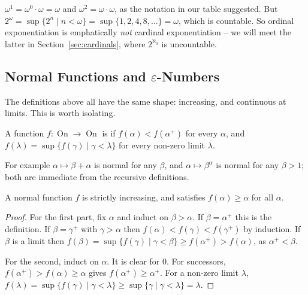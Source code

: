 \documentclass[a4paper]{scrartcl}
\newcommand{\on}{\operatorname{On}}
\begin{document}
\begin{example}
  $\omega^1 = \omega^0 \cdot \omega = \omega$ and $\omega^2 = \omega \cdot \omega$, as the notation in our table suggested. But $2^\omega = \sup\{2^n \mid n < \omega\} = \sup\{1, 2, 4, 8, \dots\} = \omega$, which is countable. So ordinal exponentiation is emphatically \emph{not} cardinal exponentiation -- we will meet the latter in Section~\ref{sec:cardinals}, where $2^{\aleph_0}$ is uncountable.
\end{example}

\subsection{Normal Functions and \texorpdfstring{$\varepsilon$}{epsilon}-Numbers}

The definitions above all have the same shape: increasing, and continuous at limits. This is worth isolating.

\begin{definition}
  A function $f: \on \to \on$ is  if $f(\alpha) < f(\alpha^+)$ for every $\alpha$, and $f(\lambda) = \sup\{f(\gamma) \mid \gamma < \lambda\}$ for every non-zero limit $\lambda$.
\end{definition}

For example $\alpha \mapsto \beta + \alpha$ is normal for any $\beta$, and $\alpha \mapsto \beta^\alpha$ is normal for any $\beta > 1$; both are immediate from the recursive definitions.

\begin{lemma}\label{lem:normalinc}
  A normal function $f$ is strictly increasing, and satisfies $f(\alpha) \geq \alpha$ for all $\alpha$.
\end{lemma}
\begin{proof}
  For the first part, fix $\alpha$ and induct on $\beta > \alpha$. If $\beta = \alpha^+$ this is the definition. If $\beta = \gamma^+$ with $\gamma > \alpha$ then $f(\alpha) < f(\gamma) < f(\gamma^+)$ by induction. If $\beta$ is a limit then $f(\beta) = \sup\{f(\gamma) \mid \gamma < \beta\} \geq f(\alpha^+) > f(\alpha)$, as $\alpha^+ < \beta$.

  For the second, induct on $\alpha$. It is clear for $0$. For successors, $f(\alpha^+) > f(\alpha) \geq \alpha$ gives $f(\alpha^+) \geq \alpha^+$. For a non-zero limit $\lambda$, $f(\lambda) = \sup\{f(\gamma) \mid \gamma < \lambda\} \geq \sup\{\gamma \mid \gamma < \lambda\} = \lambda$.
\end{proof}
\end{document}
